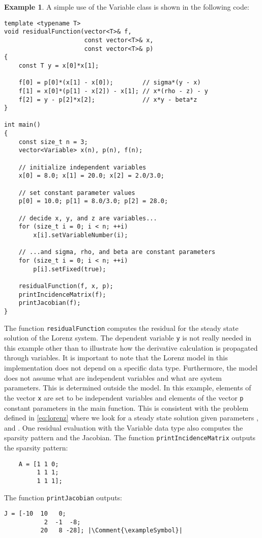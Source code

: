 \documentclass[10pt]{ijnam}
\newcommand*{\Comment}[1]{\hfill #1 }
\theoremstyle{definition}
\newtheorem{example}{Example}[section]
\newcommand\xqed[1]{\leavevmode\unskip\penalty9999 \hbox{}\nobreak\hfill \quad\hbox{#1}}
\newcommand{\exampleSymbol}{\xqed{}}
\begin{document}
\begin{example}
A simple use of the Variable class is shown in the following code:
\begin{lstlisting}
template <typename T>
void residualFunction(vector<T>& f,
                      const vector<T>& x,
                      const vector<T>& p)
{
    const T y = x[0]*x[1];
    
    f[0] = p[0]*(x[1] - x[0]);        // sigma*(y - x)
    f[1] = x[0]*(p[1] - x[2]) - x[1]; // x*(rho - z) - y
    f[2] = y - p[2]*x[2];             // x*y - beta*z
}

int main()
{
    const size_t n = 3;
    vector<Variable> x(n), p(n), f(n);
    
    // initialize independent variables
    x[0] = 8.0; x[1] = 20.0; x[2] = 2.0/3.0;    
    
    // set constant parameter values
    p[0] = 10.0; p[1] = 8.0/3.0; p[2] = 28.0;
    
    // decide x, y, and z are variables... 
    for (size_t i = 0; i < n; ++i)
        x[i].setVariableNumber(i);
    
    // ...and sigma, rho, and beta are constant parameters    
    for (size_t i = 0; i < n; ++i)
        p[i].setFixed(true);
    
    residualFunction(f, x, p);
    printIncidenceMatrix(f);
    printJacobian(f);
}
\end{lstlisting}  
The function \texttt{residualFunction} computes the residual for the steady state solution of the Lorenz system. The dependent variable \texttt{y} is not really needed in this example other than to illustrate how the derivative calculation is propagated through variables. It is important to note that the Lorenz model in this implementation does not depend on a specific data type. Furthermore, the model does not assume what are independent variables and what are system parameters. This is determined outside the model. In this example, elements of the vector \texttt{x} are set to be independent variables and elements of the vector \texttt{p} constant parameters in the main function. This is consistent with the problem defined in \eqref{eq:lorenz} where we look for a steady state solution given parameters ,  and .
One residual evaluation with the Variable data type also computes the sparsity pattern and the Jacobian. The function \texttt{printIncidenceMatrix} outputs the sparsity pattern:
\begin{lstlisting}
    A = [1 1 0;
         1 1 1;
         1 1 1];
\end{lstlisting}
The function \texttt{printJacobian} outputs:
\begin{lstlisting}[mathescape]
    J = [-10  10   0;
           2  -1  -8;
          20   8 -28]; |\Comment{\exampleSymbol}|
\end{lstlisting}
\end{example}
\end{document}

